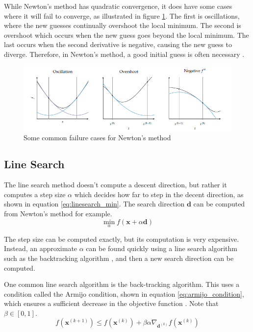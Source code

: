 While Newton's method has quadratic convergence, it does have some cases where it will fail to converge, as illustrated in figure \ref{fig:newton_failure}. The first is oscillations, where the new guesses continually overshoot the local minimum. The second is overshoot which occurs when the new guess goes beyond the local minimum. The last occurs when the second derivative is negative, causing the new guess to diverge. Therefore, in Newton's method, a good initial guess is often necessary \cite{Kochenderfer_Wheeler_2019}.
\begin{figure}[ht]
	\centering
	\includegraphics[width=0.9\linewidth]{figures/chapter_2/NewtonFailure.png}
	\caption{Some common failure cases for Newton's method \cite{Kochenderfer_Wheeler_2019}}
	\label{fig:newton_failure}
\end{figure}

\subsection*{Line Search}
The line search method doesn't compute a descent direction, but rather it computes a step size $\alpha$ which decides how far to step in the decent direction, as shown in equation \ref{eq:linesearch_min}. The search direction $\mathbf d$ can be computed from Newton's method for example.
\begin{equation}
	\min_\alpha f(\mathbf x + \alpha \mathbf d)
	\label{eq:linesearch_min}
\end{equation}

The step size can be computed exactly, but its computation is very expensive. Instead, an approximate $\alpha$ can be found quickly using a line search algorithm such as the backtracking algorithm \cite{Kochenderfer_Wheeler_2019}, and then a new search direction can be computed. 

One common line search algorithm is the back-tracking algorithm. This uses a condition called the Armijo condition, shown in equation \ref{eq:armijo_condition}, which ensures a sufficient decrease in the objective function \cite{Kochenderfer_Wheeler_2019}. Note that $\beta\in[0,1]$.
\begin{equation}
	f(\mathbf x^{(k+1)}) \leq f(\mathbf x^(k)) + \beta\alpha\nabla_{\mathbf d^{(k)}}f(\mathbf x^{(k)})
	\label{eq:armijo_condition}
\end{equation}

